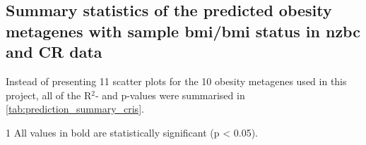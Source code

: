 \begin{appendices}
	\newpage

	\section{Summary statistics of the predicted obesity metagenes with sample \gls{bmi}/\gls{bmi} status in \gls{nzbc} and CR data}
	\label{sec:summary_statistics_of_the_predicted_obesity_metagenes_with_sample_bmi_bmi_status_in_nzbc_and_cr_data}

	Instead of presenting 11 scatter plots for the 10 obesity metagenes used in this project, all of the R$^2$- and p-values were summarised in \cref{tab:prediction_summary_cris}.

	\begin{TableNotes}
		\begin{footnotesize}
		\item [1] All values in bold are statistically significant (p \textless{} 0.05).
		\end{footnotesize}
	\end{TableNotes}


\end{appendices}
